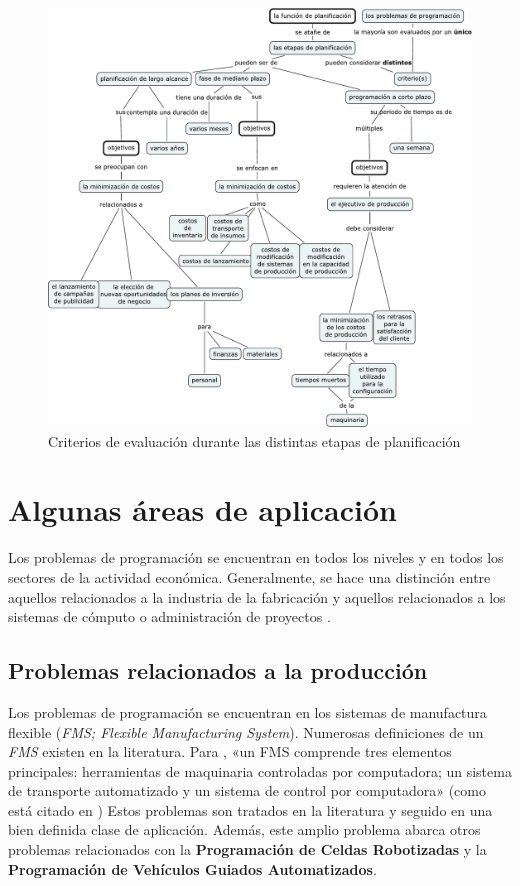 \documentclass[spanish,draft,12pt,headsepline,footsepline,paper=letter]{scrreprt}
\begin{document}
\begin{figure}[hbtp]
\centering
\includegraphics[height=.90\textheight]{media/criterios_evaluacion.pdf}
\caption[Criterios de evaluación]{Criterios de evaluación durante las distintas etapas de planificación}
\label{fig:criterios_evaluacion}
\end{figure}


\section{Algunas áreas de aplicación}
\label{algunas_areas_aplicacion}

Los problemas de programación se encuentran en todos los niveles y en todos los sectores de la actividad económica. Generalmente, se hace una distinción entre aquellos relacionados a la industria de la fabricación y aquellos relacionados a los sistemas de cómputo o administración de proyectos \citep[p.~6]{TKindt2002}.

\subsection{Problemas relacionados a la producción} %
\label{problemas_relacionados_produccion}

Los problemas de programación se encuentran en los sistemas de manufactura flexible (\textit{FMS; Flexible Manufacturing System}). Numerosas definiciones de un \textit{FMS} existen en la literatura. Para \citet{liu1996classification}, «un FMS comprende tres elementos principales: herramientas de maquinaria controladas por computadora; un sistema de transporte automatizado y un sistema de control por computadora» (como está citado en \citealp[p.~6]{TKindt2002})  Estos problemas son tratados en la literatura y seguido en una bien definida clase de aplicación. Además, este amplio problema abarca otros problemas relacionados con la \textbf{Programación de Celdas Robotizadas} y la \textbf{Programación de Vehículos Guiados Automatizados}.
\end{document}
